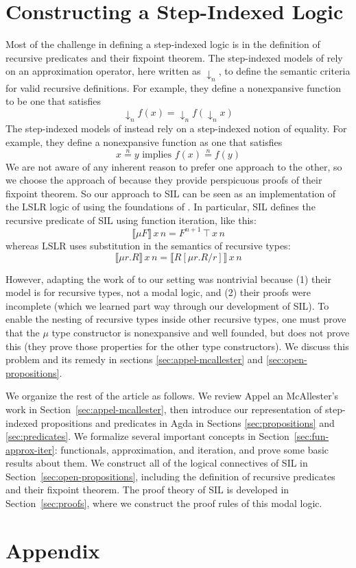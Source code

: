 \documentclass[acmsmall]{acmart}
\begin{document}
\section{Constructing a Step-Indexed Logic}

Most of the challenge in defining a step-indexed logic is in the
definition of recursive predicates and their fixpoint theorem. The
step-indexed models of \citet{Appel:2001aa} rely on an approximation
operator, here written as $↓_n$, to define the semantic criteria for
valid recursive definitions.  For example, they define a nonexpansive
function to be one that satisfies
\[
  ↓_n f(x) = ↓_n f(↓_n x)
\]
The step-indexed models of \citet{JUNG:2018aa} instead rely on
a step-indexed notion of equality. For example, they define a
nonexpansive function as one that satisfies
\[
  x \stackrel{n}{=} y \text{ implies } f(x) \stackrel{n}{=} f(y)
\]
We are not aware of any inherent reason to prefer one approach to the
other, so we choose the approach of \citet{Appel:2001aa} because they
provide perspicuous proofs of their fixpoint theorem.  So our approach
to SIL can be seen as an implementation of the LSLR logic of
\citet{Dreyer:2011wl} using the foundations of
\citet{Appel:2001aa}. In particular, SIL defines the recursive
predicate of SIL using function iteration, like this:
\[
  ⟦ μ F ⟧ \, x \, n = F^{n\plus 1}\, \top \, x \, n
\]
whereas LSLR uses substitution in the semantics of recursive types:
\[
   ⟦ μ r. R ⟧ \, x \, n = ⟦ R[μr.R/r] ⟧\,x\,n
\]

However, adapting the work of \citet{Appel:2001aa} to our setting was
nontrivial because (1) their model is for recursive types, not a modal
logic, and (2) their proofs were incomplete (which we learned part way
through our development of SIL). To enable the nesting of recursive
types inside other recursive types, one must prove that the $μ$ type
constructor is nonexpansive and well founded, but \citet{Appel:2001aa}
does not prove this (they prove those properties for the other type
constructors).  We discuss this problem and its remedy in sections
\ref{sec:appel-mcallester} and \ref{sec:open-propositions}.

We organize the rest of the article as follows. We review Appel an
McAllester's work in Section~\ref{sec:appel-mcallester}, then
introduce our representation of step-indexed propositions and
predicates in Agda in Sections \ref{sec:propositions} and
\ref{sec:predicates}.  We formalize several important concepts in
Section~\ref{sec:fun-approx-iter}: functionals, approximation, and
iteration, and prove some basic results about them.  We construct all
of the logical connectives of SIL in
Section~\ref{sec:open-propositions}, including the definition of
recursive predicates and their fixpoint theorem.  The proof theory of
SIL is developed in Section~\ref{sec:proofs}, where we construct the
proof rules of this modal logic.





% 





\appendix
{}
\section*{Appendix}
\end{document}
